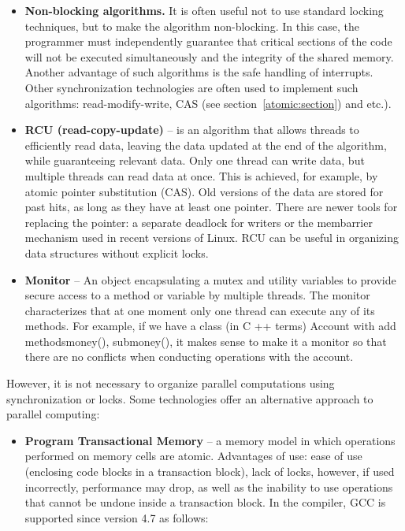 {\begin{itemize}
			\item\textbf{Non-blocking algorithms.} It is often useful not to use standard locking techniques, but to make the algorithm non-blocking. In this case, the programmer must independently guarantee that critical sections of the code will not be executed simultaneously and the integrity of the shared memory. Another advantage of such algorithms is the safe handling of interrupts. Other synchronization technologies are often used to implement such algorithms: read-modify-write, CAS (see section~\ref{atomic:section}) and etc.).
			\item\textbf{RCU (read-copy-update)} – is an algorithm that allows threads to efficiently read data, leaving the data updated at the end of the algorithm, while guaranteeing relevant data. Only one thread can write data, but multiple threads can read data at once. This is achieved, for example, by atomic pointer substitution (CAS). Old versions of the data are stored for past hits, as long as they have at least one pointer. There are newer tools for replacing the pointer: a separate deadlock for writers or the membarrier mechanism used in recent versions of Linux. RCU can be useful in organizing data structures without explicit locks.
			\item\textbf{Monitor} – An object encapsulating a mutex and utility variables to provide secure access to a method or variable by multiple threads. The monitor characterizes that at one moment only one thread can execute any of its methods. For example, if we have a class (in C ++ terms) Account with add methods\textunderscore money(), sub\textunderscore money(), it makes sense to make it a monitor so that there are no conflicts when conducting operations with the account.
		\end{itemize}
		\par However, it is not necessary to organize parallel computations using synchronization or locks. Some technologies offer an alternative approach to parallel computing:
		\begin{itemize}
			\item\textbf{Program Transactional Memory} – a memory model in which operations performed on memory cells are atomic. Advantages of use: ease of use (enclosing code blocks in a transaction block), lack of locks, however, if used incorrectly, performance may drop, as well as the inability to use operations that cannot be undone inside a transaction block. In the compiler, GCC is supported since version 4.7 as follows:
				\begin{enumerate}

\end{enumerate}
\end{itemize}}
